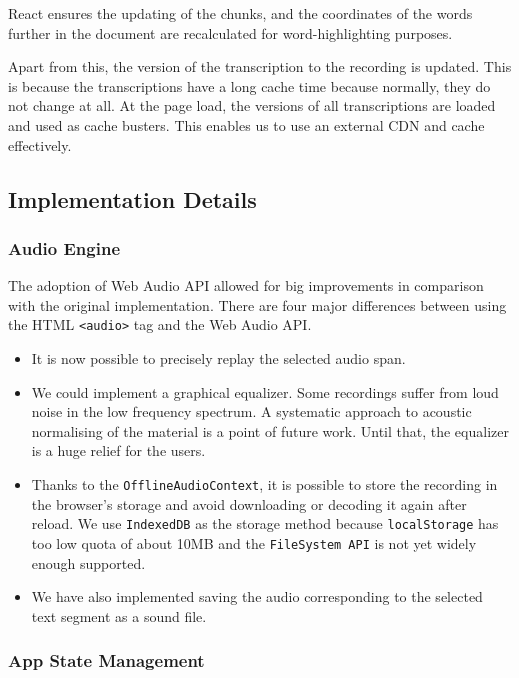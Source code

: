 \documentclass{svproc}
\begin{document}
React ensures the updating of the chunks, and the coordinates of the words
further in the document are recalculated for word-highlighting purposes.

Apart from this, the version of the transcription to the recording is updated.
This is because the transcriptions have a long cache time because normally, they
do not change at all. At the page load, the versions of all transcriptions are
loaded and used as cache busters. This enables us to use an external CDN and
cache effectively.

\subsection{Implementation Details}

\subsubsection{Audio Engine}

The adoption of Web Audio API\cite{adenot2013web} allowed for big improvements
in comparison with the original implementation. There are four major differences
between using the HTML \texttt{<audio>} tag and the Web Audio API.

\begin{itemize}
\item{It is now possible to precisely replay the selected audio span.}
\item{
    We could implement a graphical equalizer. Some recordings suffer from loud
    noise in the low frequency spectrum. A systematic approach to acoustic
    normalising of the material is a point of future work. Until that, the
    equalizer is a huge relief for the users.
}
\item{
    Thanks to the \texttt{OfflineAudioContext}, it is possible to store the
    recording in the browser's storage and avoid downloading or decoding it
    again after reload. We use \texttt{IndexedDB} as the storage method because
    \texttt{localStorage} has too low quota of about 10MB and the
    \texttt{FileSystem API} is not yet widely enough supported.
}
\item{
    We have also implemented saving the audio corresponding to the selected text
    segment as a sound file.
}
\end{itemize}

\subsubsection{App State Management}
\end{document}
